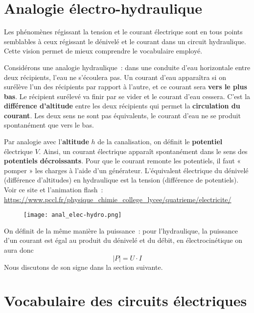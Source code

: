 \documentclass[../main/main.tex]{subfiles}
\begin{document}
\section{Analogie électro-hydraulique}

Les phénomènes régissant la tension et le courant électrique sont en tous points
semblables à ceux régissant le dénivelé et le courant dans un circuit
hydraulique. Cette vision permet de mieux comprendre le vocabulaire employé.

Considérons une analogie hydraulique~: dans une conduite d'eau horizontale entre
deux récipients, l'eau ne s'écoulera pas. Un courant d'eau apparaîtra si on
surélève l'un des récipients par rapport à l'autre, et ce courant sera
\textbf{vers le plus bas}. Le récipient surélevé va finir par se vider et le
courant d'eau cessera. C'est la \textbf{différence d'altitude} entre les deux
récipients qui permet la \textbf{circulation du courant}. Les deux sens ne sont
pas équivalents, le courant d'eau ne se produit spontanément que vers le bas.

Par analogie avec l'\textbf{altitude} $h$ de la canalisation, on définit le
\textbf{potentiel} électrique $V$. Ainsi, un courant électrique apparaît
spontanément dans le sens des \textbf{potentiels décroissants}. Pour que le
courant remonte les potentiels, il faut « pomper » les charges à l'aide d'un
générateur. L'équivalent électrique du dénivelé (différence d'altitudes) en
hydraulique est la tension (différence de potentiels). Voir ce site et
l'animation flash~: \href{https://www.pccl.fr/physique\_chimie\_college\_lycee/quatrieme/electricite/analogie\_hydraulique.htm}
{https://www.pccl.fr/physique\_chimie\_college\_lycee/quatrieme/electricite/}

\begin{figure}[h]
    \centering
    \texttt{[image: anal\_elec-hydro.png]}
    \label{fig:anal_elec-hydro}
\end{figure}

On définit de la même manière la puissance~: pour l'hydraulique, la puissance
d'un courant est égal au produit du dénivelé et du débit, en
électrocinétique on aura donc
\[\boxed{\left| P \right| = U\cdot I}\]
Nous discutons de son signe dans la section suivante.

\section{Vocabulaire des circuits électriques}
\end{document}
